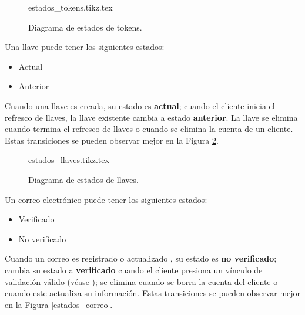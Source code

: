 \begin{figure}
  \begin{center}
    {estados_tokens.tikz.tex}
    \caption{Diagrama de estados de tokens.}
    \label{estados_token}
  \end{center}
\end{figure}

{
  Una llave puede tener los siguientes estados:
  \begin{itemize}
    \item Actual
    \item Anterior
  \end{itemize}

  \begin{hangparas}{2em}{0}
    Cuando una llave es creada, su estado es \textbf{actual}; cuando el cliente
    inicia el refresco de llaves, la llave existente cambia a estado
    \textbf{anterior}. La llave se elimina cuando termina el refresco de llaves
    o cuando se elimina la cuenta de un cliente. Estas transiciones se pueden
    observar mejor en la Figura \ref{estados_llave}.
  \end{hangparas}
}

\begin{figure}
  \begin{center}
    {estados_llaves.tikz.tex}
    \caption{Diagrama de estados de llaves.}
    \label{estados_llave}
  \end{center}
\end{figure}

{
  Un correo electrónico puede tener los siguientes estados:
  \begin{itemize}
    \item Verificado
    \item No verificado
  \end{itemize}

  \begin{hangparas}{2em}{0}
    Cuando un correo es registrado o actualizado , su estado es \textbf{no
    verificado}; cambia su estado a \textbf{verificado} cuando el cliente
    presiona un vínculo de validación válido (véase
    ); se elimina cuando se
    borra la cuenta del cliente o cuando este actualiza su información. Estas
    transiciones se pueden observar mejor en la Figura \ref{estados_correo}.
  \end{hangparas}
}

